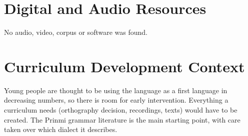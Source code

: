 \documentclass[12pt]{article}
\begin{document}
\section{Digital and Audio Resources}
No audio, video, corpus or software was found.

\section{Curriculum Development Context}
Young people are thought to be using the language as a first language in decreasing numbers, so there is room for early intervention. Everything a curriculum needs (orthography decision, recordings, texts) would have to be created. The Prinmi grammar literature is the main starting point, with care taken over which dialect it describes.
\end{document}
